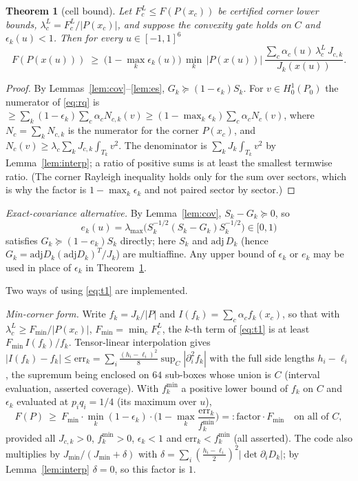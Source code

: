 \documentclass[11pt]{article}
\newtheorem{theorem}{Theorem}
\theoremstyle{remark}
\begin{document}
\begin{theorem}[cell bound]\label{thm:cell}
Let $F^L_c\le F(P(x_c))$ be certified corner lower bounds, $\lambda^L_c=F^L_c/|P(x_c)|$, and suppose the convexity gate
holds on $C$ and $\epsilon_k(u)<1$. Then for every $u\in[-1,1]^6$
\begin{equation}\label{eq:t1}
F(P(x(u)))\;\ge\;\Big(1-\max_k\epsilon_k(u)\Big)\,\min_k\,|P(x(u))|\,\frac{\sum_c\alpha_c(u)\,\lambda^L_c\,J_{c,k}}{J_k(x(u))} .
\end{equation}
\end{theorem}
\begin{proof}
By Lemmas~\ref{lem:cov}--\ref{lem:es}, $G_k\succeq(1-\epsilon_k)S_k$. For $v\in H^1_0(P_0)$ the numerator of
\eqref{eq:rq} is $\ge\sum_k(1-\epsilon_k)\sum_c\alpha_cN_{c,k}(v)\ge(1-\max_k\epsilon_k)\sum_c\alpha_cN_c(v)$, where
$N_c=\sum_kN_{c,k}$ is the numerator for the corner $P(x_c)$, and $N_c(v)\ge\lambda_c\sum_kJ_{c,k}\int_{T_k}v^2$.
The denominator is $\sum_kJ_k\int_{T_k}v^2$ by Lemma~\ref{lem:interp}; a ratio of positive sums is at least the smallest
termwise ratio. (The corner Rayleigh inequality holds only for the sum over sectors, which is why the factor is
$1-\max_k\epsilon_k$ and not paired sector by sector.)
\end{proof}

\emph{Exact-covariance alternative.} By Lemma~\ref{lem:cov}, $S_k-G_k\succeq0$, so
\[
e_k(u)=\lambda_{\max}\big(S_k^{-1/2}(S_k-G_k)S_k^{-1/2}\big)\in[0,1)
\]
satisfies $G_k\succeq(1-e_k)S_k$ directly; here $S_k$ and $\mathrm{adj}\,D_k$ (hence
$G_k=\mathrm{adj}D_k(\mathrm{adj}D_k)^T/J_k$) are multiaffine. Any upper bound of
$\epsilon_k$ or $e_k$ may be used in place of $\epsilon_k$ in Theorem~\ref{thm:cell}.

Two ways of using \eqref{eq:t1} are implemented.

\emph{Min-corner form.} Write $f_k=J_k/|P|$ and $I(f_k)=\sum_c\alpha_c f_k(x_c)$, so that with
$\lambda^L_c\ge F_{\min}/|P(x_c)|$, $F_{\min}=\min_cF^L_c$, the $k$-th term of \eqref{eq:t1} is at least
$F_{\min}\,I(f_k)/f_k$. Tensor-linear interpolation gives $|I(f_k)-f_k|\le\mathrm{err}_k=\sum_i\frac{(h_i-\ell_i)^2}{8}
\sup_C|\partial_i^2f_k|$ with the full side lengths $h_i-\ell_i$, the supremum being enclosed on $64$ sub-boxes whose
union is $C$ (interval evaluation, asserted coverage). With $f_k^{\min}$ a positive lower bound of $f_k$ on $C$ and
$\epsilon_k$ evaluated at $p_iq_i=1/4$ (its maximum over $u$),
\[
F(P)\ \ge\ F_{\min}\cdot\min_k(1-\epsilon_k)\cdot\Big(1-\max_k\frac{\mathrm{err}_k}{f_k^{\min}}\Big)=:\mathrm{factor}\cdot F_{\min}
\quad\text{on all of }C,
\]
provided all $J_{c,k}>0$, $f_k^{\min}>0$, $\epsilon_k<1$ and $\mathrm{err}_k<f^{\min}_k$ (all asserted). The code also
multiplies by $J_{\min}/(J_{\min}+\delta)$ with $\delta=\sum_i(\frac{h_i-\ell_i}2)^2|\det\partial_iD_k|$; by
Lemma~\ref{lem:interp} $\delta=0$, so this factor is $1$.
\end{document}
